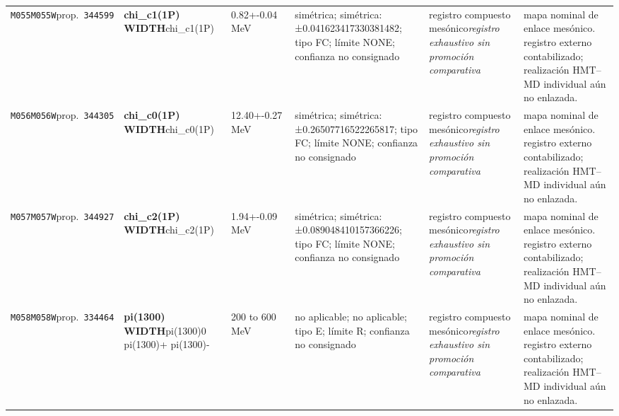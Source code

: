 \begin{landscape}
\begin{longtable}{L{1.85cm}L{4.45cm}L{2.35cm}L{4.05cm}L{3.35cm}L{7.15cm}}
\texttt{M055}\newline \texttt{M055W}\newline prop.\ \texttt{344599} & \textbf{chi\_\allowbreak{}c1(1P) WIDTH}\newline chi\_\allowbreak{}c1(1P) & 0.82+-0.04\,MeV & simétrica; simétrica: ±0.041623417330381482; tipo FC; límite NONE; confianza no consignado & registro compuesto mesónico\newline \emph{registro exhaustivo sin promoción comparativa} & mapa nominal de enlace mesónico. registro externo contabilizado; realización HMT--MD individual aún no enlazada. \\
\texttt{M056}\newline \texttt{M056W}\newline prop.\ \texttt{344305} & \textbf{chi\_\allowbreak{}c0(1P) WIDTH}\newline chi\_\allowbreak{}c0(1P) & 12.40+-0.27\,MeV & simétrica; simétrica: ±0.26507716522265817; tipo FC; límite NONE; confianza no consignado & registro compuesto mesónico\newline \emph{registro exhaustivo sin promoción comparativa} & mapa nominal de enlace mesónico. registro externo contabilizado; realización HMT--MD individual aún no enlazada. \\
\texttt{M057}\newline \texttt{M057W}\newline prop.\ \texttt{344927} & \textbf{chi\_\allowbreak{}c2(1P) WIDTH}\newline chi\_\allowbreak{}c2(1P) & 1.94+-0.09\,MeV & simétrica; simétrica: ±0.089048410157366226; tipo FC; límite NONE; confianza no consignado & registro compuesto mesónico\newline \emph{registro exhaustivo sin promoción comparativa} & mapa nominal de enlace mesónico. registro externo contabilizado; realización HMT--MD individual aún no enlazada. \\
\texttt{M058}\newline \texttt{M058W}\newline prop.\ \texttt{334464} & \textbf{pi(1300) WIDTH}\newline pi(1300)0 \textbar{}\allowbreak{} pi(1300)+ \textbar{}\allowbreak{} pi(1300)- & 200 to 600\,MeV & no aplicable; no aplicable; tipo E; límite R; confianza no consignado & registro compuesto mesónico\newline \emph{registro exhaustivo sin promoción comparativa} & mapa nominal de enlace mesónico. registro externo contabilizado; realización HMT--MD individual aún no enlazada. \\

\end{longtable}
\end{landscape}
